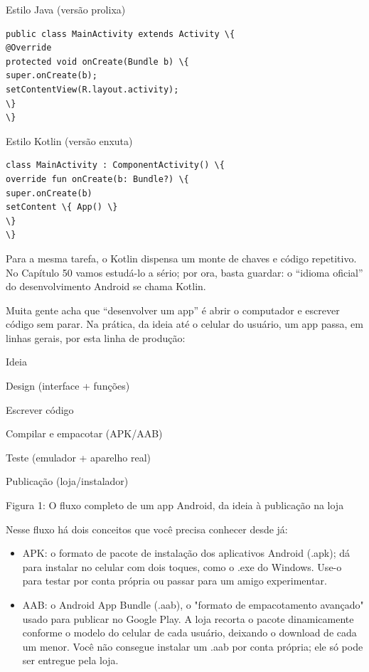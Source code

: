 Estilo Java (versão prolixa)

\begin{lstlisting}
public class MainActivity extends Activity \{
@Override
protected void onCreate(Bundle b) \{
super.onCreate(b);
setContentView(R.layout.activity);
\}
\}
\end{lstlisting}

Estilo Kotlin (versão enxuta)

\begin{lstlisting}
class MainActivity : ComponentActivity() \{
override fun onCreate(b: Bundle?) \{
super.onCreate(b)
setContent \{ App() \}
\}
\}
\end{lstlisting}

Para a mesma tarefa, o Kotlin dispensa um monte de chaves e código repetitivo. No Capítulo 50 vamos estudá-lo a sério; por ora, basta guardar: o “idioma oficial” do desenvolvimento Android se chama Kotlin.


Muita gente acha que “desenvolver um app” é abrir o computador e escrever código sem parar. Na prática, da ideia até o celular do usuário, um app passa, em linhas gerais, por esta linha de produção:

Ideia

Design (interface + funções)

Escrever código

Compilar e empacotar (APK/AAB)

Teste (emulador + aparelho real)

Publicação (loja/instalador)

\begin{center}\small\color{gray}Figura 1: O fluxo completo de um app Android, da ideia à publicação na loja\end{center}

Nesse fluxo há dois conceitos que você precisa conhecer desde já:

\begin{itemize}
  \item APK: o formato de pacote de instalação dos aplicativos Android (.apk); dá para instalar no celular com dois toques, como o .exe do Windows. Use-o para testar por conta própria ou passar para um amigo experimentar.
  \item AAB: o Android App Bundle (.aab), o "formato de empacotamento avançado" usado para publicar no Google Play. A loja recorta o pacote dinamicamente conforme o modelo do celular de cada usuário, deixando o download de cada um menor. Você não consegue instalar um .aab por conta própria; ele só pode ser entregue pela loja.
\end{itemize}

